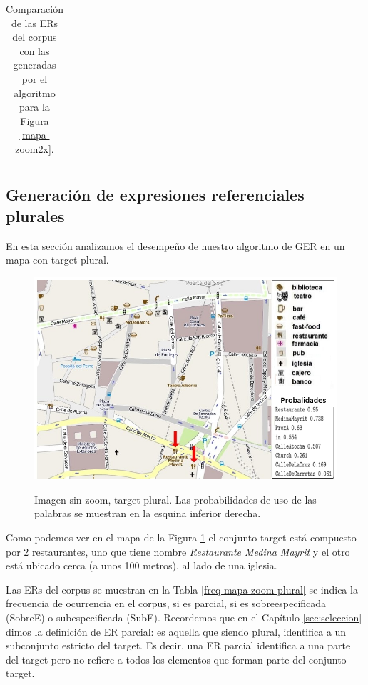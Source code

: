 \begin{table}[h]
{\begin{center}
\begin{tabular}{|l|l|c|c|c|}
\end{tabular}
\caption{Comparaci\'on de las ERs del corpus con las generadas por el algoritmo para la Figura \ref{mapa-zoom2x}.}\label{compara-mapa-zoom2x}
\end{center}
}
\end{table}

\subsection{Generaci\'on de expresiones referenciales plurales}
\label{sec:plural}

En esta secci\'on analizamos el desempe\~no de nuestro algoritmo de GER en un mapa con target plural.
 
\begin{figure}[H]
\centering
\includegraphics[width=\textwidth]{images/corpus/mapa10conProb.png}\\[0pt]
\caption{Imagen sin zoom, target plural. Las probabilidades de uso de las palabras se muestran en la esquina inferior derecha.}
\label{mapa-zoom-plural}
\end{figure}

Como podemos ver en el mapa de la Figura \ref{mapa-zoom-plural} el conjunto target est\'a compuesto por 2 restaurantes, uno que tiene nombre {\it Restaurante Medina Mayrit} y el otro est\'a ubicado cerca (a unos 100 metros), al lado de una iglesia. 

Las ERs del corpus se muestran en la Tabla \ref{freq-mapa-zoom-plural} se indica la frecuencia de ocurrencia en el corpus, si es parcial, si es sobreespecificada (SobreE) o subespecificada (SubE). 
Recordemos que en el Cap\'itulo \ref{sec:seleccion} dimos la definici\'on de ER parcial: es aquella que siendo plural, identifica a un subconjunto estricto del target. Es decir, una ER parcial identifica a una parte del target pero no refiere a todos los elementos que forman parte del conjunto target.

